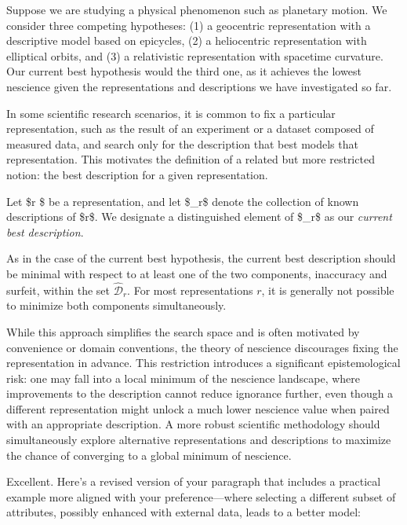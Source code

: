 \begin{example}
Suppose we are studying a physical phenomenon such as planetary motion. We consider three competing hypotheses: (1) a geocentric representation with a descriptive model based on epicycles, (2) a heliocentric representation with elliptical orbits, and (3) a relativistic representation with spacetime curvature. Our current best hypothesis would the third one, as it achieves the lowest nescience given the representations and descriptions we have investigated so far.
\end{example}

In some scientific research scenarios, it is common to fix a particular representation, such as the result of an experiment or a dataset composed of measured data, and search only for the description that best models that representation. This motivates the definition of a related but more restricted notion: the best description for a given representation.

\begin{definition}
Let \$r \in {}\$ be a representation, and let \$\_r\$ denote the collection of known descriptions of \$r\$. We designate a distinguished element of \$\_r\$ as our \emph{current best description}.
\end{definition}

As in the case of the current best hypothesis, the current best description should be minimal with respect to at least one of the two components, inaccuracy and surfeit, within the set $\hat{\mathcal{D}}_r$. For most representations $r$, it is generally not possible to minimize both components simultaneously.

While this approach simplifies the search space and is often motivated by convenience or domain conventions, the theory of nescience discourages fixing the representation in advance. This restriction introduces a significant epistemological risk: one may fall into a local minimum of the nescience landscape, where improvements to the description cannot reduce ignorance further, even though a different representation might unlock a much lower nescience value when paired with an appropriate description. A more robust scientific methodology should simultaneously explore alternative representations and descriptions to maximize the chance of converging to a global minimum of nescience.

Excellent. Here's a revised version of your paragraph that includes a practical example more aligned with your preference—where selecting a different subset of attributes, possibly enhanced with external data, leads to a better model:

